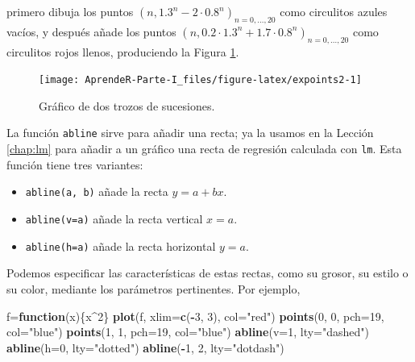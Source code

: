 \documentclass[]{book}
\newenvironment{Shaded}{\begin{snugshade}}{\end{snugshade}}
\newcommand{\ControlFlowTok}[1]{\textcolor[rgb]{0.13,0.29,0.53}{\textbf{#1}}}
\newcommand{\DataTypeTok}[1]{\textcolor[rgb]{0.13,0.29,0.53}{#1}}
\newcommand{\DecValTok}[1]{\textcolor[rgb]{0.00,0.00,0.81}{#1}}
\newcommand{\KeywordTok}[1]{\textcolor[rgb]{0.13,0.29,0.53}{\textbf{#1}}}
\newcommand{\NormalTok}[1]{#1}
\newcommand{\OperatorTok}[1]{\textcolor[rgb]{0.81,0.36,0.00}{\textbf{#1}}}
\newcommand{\StringTok}[1]{\textcolor[rgb]{0.31,0.60,0.02}{#1}}
\providecommand{\tightlist}{%
  \setlength{\itemsep}{0pt}\setlength{\parskip}{0pt}}
\theoremstyle{definition}
\theoremstyle{definition}
\theoremstyle{definition}
\theoremstyle{remark}
\begin{document}
primero dibuja los puntos \((n, 1.3^n-2\cdot 0.8^n)_{n=0, \ldots, 20}\) como circulitos azules vacíos, y después añade los puntos \((n, 0.2\cdot 1.3^n+1.7 \cdot 0.8^n)_{n=0, \ldots, 20}\) como circulitos rojos llenos, produciendo la Figura \ref{fig:expoints2}.

\begin{figure}

{\centering \texttt{[image: AprendeR-Parte-I\_files/figure-latex/expoints2-1]} 

}

\caption{Gráfico de dos trozos de sucesiones.}\label{fig:expoints2}
\end{figure}

La función \texttt{abline} sirve para añadir una recta; ya la usamos en la Lección \ref{chap:lm} para añadir a un gráfico una recta de regresión calculada con \texttt{lm}. Esta función tiene tres
variantes:

\begin{itemize}
\tightlist
\item
  \texttt{abline(a,\ b)} añade la recta \(y=a+bx\).
\item
  \texttt{abline(v=a)} añade la recta vertical \(x=a\).
\item
  \texttt{abline(h=a)} añade la recta horizontal \(y=a\).
\end{itemize}

Podemos especificar las características de estas rectas, como su grosor, su estilo o su color, mediante los
parámetros pertinentes. Por ejemplo,

\begin{Shaded}
\begin{Highlighting}[]
\NormalTok{f=}\ControlFlowTok{function}\NormalTok{(x)\{x}\OperatorTok{^}\DecValTok{2}\NormalTok{\}}
\KeywordTok{plot}\NormalTok{(f, }\DataTypeTok{xlim=}\KeywordTok{c}\NormalTok{(}\OperatorTok{-}\DecValTok{3}\NormalTok{, }\DecValTok{3}\NormalTok{), }\DataTypeTok{col=}\StringTok{"red"}\NormalTok{)}
\KeywordTok{points}\NormalTok{(}\DecValTok{0}\NormalTok{, }\DecValTok{0}\NormalTok{, }\DataTypeTok{pch=}\DecValTok{19}\NormalTok{, }\DataTypeTok{col=}\StringTok{"blue"}\NormalTok{)}
\KeywordTok{points}\NormalTok{(}\DecValTok{1}\NormalTok{, }\DecValTok{1}\NormalTok{, }\DataTypeTok{pch=}\DecValTok{19}\NormalTok{, }\DataTypeTok{col=}\StringTok{"blue"}\NormalTok{)}
\KeywordTok{abline}\NormalTok{(}\DataTypeTok{v=}\DecValTok{1}\NormalTok{, }\DataTypeTok{lty=}\StringTok{"dashed"}\NormalTok{)}
\KeywordTok{abline}\NormalTok{(}\DataTypeTok{h=}\DecValTok{0}\NormalTok{, }\DataTypeTok{lty=}\StringTok{"dotted"}\NormalTok{)}
\KeywordTok{abline}\NormalTok{(}\OperatorTok{-}\DecValTok{1}\NormalTok{, }\DecValTok{2}\NormalTok{, }\DataTypeTok{lty=}\StringTok{"dotdash"}\NormalTok{)}
\end{Highlighting}
\end{Shaded}
\end{document}
